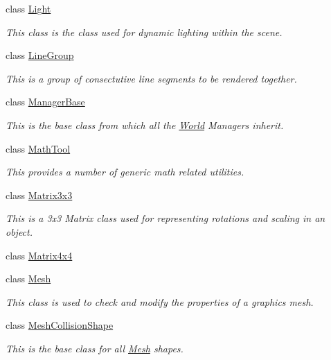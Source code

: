 \begin{DoxyCompactItemize}
class \hyperlink{classMezzanine_1_1Light}{Light}
\begin{DoxyCompactList}\small\item\em This class is the class used for dynamic lighting within the scene. \item\end{DoxyCompactList}\item 
class \hyperlink{classMezzanine_1_1LineGroup}{LineGroup}
\begin{DoxyCompactList}\small\item\em This is a group of consectutive line segments to be rendered together. \item\end{DoxyCompactList}\item 
class \hyperlink{classMezzanine_1_1ManagerBase}{ManagerBase}
\begin{DoxyCompactList}\small\item\em This is the base class from which all the \hyperlink{classMezzanine_1_1World}{World} Managers inherit. \item\end{DoxyCompactList}\item 
class \hyperlink{classMezzanine_1_1MathTool}{MathTool}
\begin{DoxyCompactList}\small\item\em This provides a number of generic math related utilities. \item\end{DoxyCompactList}\item 
class \hyperlink{classMezzanine_1_1Matrix3x3}{Matrix3x3}
\begin{DoxyCompactList}\small\item\em This is a 3x3 Matrix class used for representing rotations and scaling in an object. \item\end{DoxyCompactList}\item 
class \hyperlink{classMezzanine_1_1Matrix4x4}{Matrix4x4}
\item 
class \hyperlink{classMezzanine_1_1Mesh}{Mesh}
\begin{DoxyCompactList}\small\item\em This class is used to check and modify the properties of a graphics mesh. \item\end{DoxyCompactList}\item 
class \hyperlink{classMezzanine_1_1MeshCollisionShape}{MeshCollisionShape}
\begin{DoxyCompactList}\small\item\em This is the base class for all \hyperlink{classMezzanine_1_1Mesh}{Mesh} shapes. \item\end{DoxyCompactList}\item 

\end{DoxyCompactItemize}

